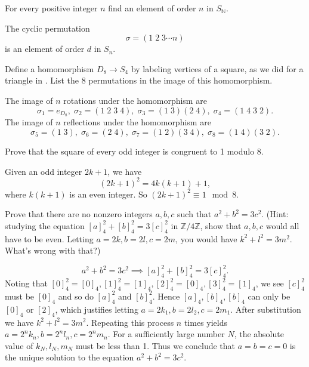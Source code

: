 \documentclass[12pt,letterpaper,boxed]{hmcpset}
\begin{document}
\begin{problem}[2.3]
	For every positive integer $n$ find an element of order $n$ in $S_\mathbb{N}$.
\end{problem}
\begin{solution}
The cyclic permutation 
\[
\sigma=(1\;2\;3\cdots n)
\]
is an element of order $d$ in $S_n$.
\end{solution}



\begin{problem}[2.4]	
	Define a homomorphism $D_8 \rightarrow S_4$ by labeling vertices of a square, as we did
	for a triangle in . List the 8 permutations in the image of this homomorphism.
\end{problem}
\begin{solution}
	The image of $n$ rotations under the homomorphism are
	\[
	\sigma_1=e_{D_8},\;\sigma_2=(1\;2\;3\;4),\;\sigma_3=(1\;3)(2\;4),\;\sigma_4=(1\;4\;3\;2).
	\]
	The image of $n$ reflections under the homomorphism are
	\[
	\sigma_5=(1\;3),\;\sigma_6=(2\;4),\;\sigma_7=(1\;2)(3\;4),\;\sigma_8=(1\;4)(3\;2).
	\]
\end{solution}



\begin{problem}[2.11]	
	Prove that the square of every odd integer is congruent to 1 modulo 8.
\end{problem}
\begin{solution}
	Given an odd integer $2k+1$, we have
	\[
	(2k+1)^2=4k(k+1)+1,
	\]
	where $k(k+1)$ is an even integer. So $(2k+1)^2\equiv1\mod 8$.
\end{solution}



\begin{problem}[2.12]	
	Prove that there are no nonzero integers $a, b, c$ such that $a^2+b^2=3c^2$. (Hint: studying the equation $[a]^2_4+[b]^2_4=3[c]^2_4$ in $\mathbb{Z}/4\mathbb{Z}$, show that $a, b, c$ would all have to be even. Letting $a=2k, b=2l,c=2m$, you would have $k^2+l^2=3m^2$. What's wrong with that?)
\end{problem}
\begin{solution}
	\[
	a^2+b^2=3c^2\implies [a]^2_4+[b]^2_4=3[c]_4^2.
	\]
	Noting that $[0]^2_4=[0]_4,[1]^2_4=[1]_4,[2]^2_4=[0]_4,[3]^2_4=[1]_4$, we see $[c]_4^2$ must be $[0]_4$ and so do $[a]_4^2$ and $[b]_4^2$. Hence  $[a]_4,[b]_4,[b]_4$ can only be $[0]_4$ or $[2]_4$, which justifies letting $a=2k_1, b=2l_2,c=2m_1$. After substitution we have $k^2+l^2=3m^2$. Repeating this process $n$ times yields $a=2^nk_n, b=2^nl_n,c=2^nm_n$. For a sufficiently large number $N$, the absolute value of $k_N,l_N,m_N$ must be less than 1. Thus we conclude that $a=b=c=0$ is the unique solution to the equation $a^2+b^2=3c^2$.
\end{solution}
    
\end{document}
